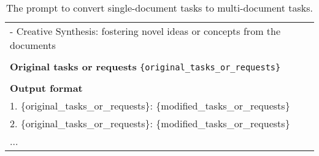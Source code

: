 \begin{table}[h!]
\begin{minipage}{\textwidth}
\begin{tcolorbox}
\begin{tabular}{p{}}
    - Creative Synthesis: fostering novel ideas or concepts from the documents\\
    \\
    \textbf{Original tasks or requests}
    {\tt \{original{\_}tasks{\_}or{\_}requests\}}\\
    \\
    \textbf{Output format}\\
    1. { \{original{\_}tasks{\_}or{\_}requests\}}: { \{modified{\_}tasks{\_}or{\_}requests\}}\\
    2. { \{original{\_}tasks{\_}or{\_}requests\}}: { \{modified{\_}tasks{\_}or{\_}requests\}}\\
    ...\\
    \end{tabular}
\end{tcolorbox}
\caption{The prompt to convert single-document tasks to multi-document tasks. }
    \label{tab:prompt_single_to_multi}
\end{minipage}
\end{table}





